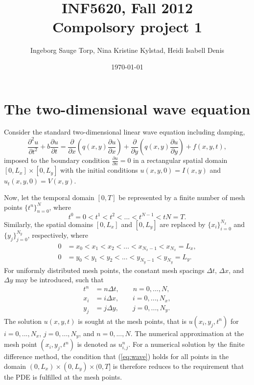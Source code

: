 \documentclass[11pt]{article}
\begin{document}
\title{INF5620, Fall 2012 \\Compolsory project 1}
\date{\today }
\author{Ingeborg Sauge Torp, Nina Kristine Kylstad, Heidi Isabell Denis}
\maketitle

\section*{The two-dimensional wave equation}
Consider the standard two-dimensional linear wave equation including damping,
\begin{equation} \label{eq:wave}
\frac{\partial^2 u}{\partial t^2} + b\frac{\partial u}{\partial t} = \frac{\partial}{\partial x} \left( q(x,y) \frac{\partial u}{\partial x} \right) + \frac{\partial}{\partial y} \left( q(x,y) \frac{\partial u}{\partial y} \right) + f(x,y,t),
\end{equation}
imposed to the boundary condition $\frac{\partial u}{\partial n} = 0$ in a rectangular spatial domain $\left[0, L_x \right] \times \left[0, L_y \right]$ with the initial conditions $u(x,y,0) = I(x,y)$ and $u_t(x,y,0) = V(x,y)$.

Now, let the temporal domain $\left[0, T\right]$ be represented by a finite number of mesh points $\{t^n\}_{n=0}^N$, where
\begin{equation*}
t^0 = 0 < t^1< t^2 < ... < t^{N-1} < tN = T.
\end{equation*}
Similarly, the spatial domains $\left[0,L_x \right]$ and $\left[0,L_y \right]$ are replaced by  $\{x_i\}_{i=0}^{N_x}$ and $\{y_j\}_{j=0}^{N_y}$, respectively, where
\begin{align*}
0 &= x_0 < x_1 < x_2 < ... < x_{N_x - 1} < x_{N_x} = L_x, \\
0 &= y_0 < y_1 < y_2 < ... < y_{N_y - 1} < y_{N_y} = L_y.
\end{align*}
For uniformly distributed mesh points, the constant mesh spacings $\Delta t$, $\Delta x$, and $\Delta y$ may be introduced, such that
\begin{align*}
t^n &= n \Delta t, \qquad n = 0, ..., N, \\
x_i &= i \Delta x, \qquad i = 0, ..., N_x, \\
y_j &= j \Delta y, \qquad j = 0, ..., N_y.
\end{align*}
The solution $u(x,y,t)$ is sought at the mesh points, that is $u(x_i, y_j, t^n)$ for $i = 0, ..., N_x$, $j = 0, ..., N_y$, and $n = 0, ..., N$. The numerical approximation at the mesh point $(x_i, y_j, t^n)$ is denoted as $u_{i,j}^n$.
For a numerical solution by the finite difference method, the condition that (\ref{eq:wave}) holds for all points in the domain $(0, L_x) \times (0, L_y) \times (0, T]$ is therefore reduces to the requirement that the PDE is
fulfilled at the mesh points.
\end{document}
